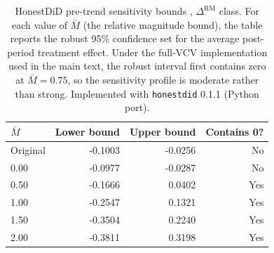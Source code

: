 \begin{table}[ht]
\centering
\caption{HonestDiD pre-trend sensitivity bounds \citep{rambachan2023honest}, $\Delta^{\text{RM}}$ class. For each value of $\bar{M}$ (the relative magnitude bound), the table reports the robust 95\% confidence set for the average post-period treatment effect. Under the full-VCV implementation used in the main text, the robust interval first contains zero at $\bar M=0.75$, so the sensitivity profile is moderate rather than strong. Implemented with \texttt{honestdid} 0.1.1 (Python port).}
\label{tab:honestdid_bounds}
\small \setlength{\tabcolsep}{6pt}
\begin{tabular}{lrrr}
\toprule
$\bar{M}$ & Lower bound & Upper bound & Contains 0? \\
\midrule
Original & -0.1003 & -0.0256 & No \\
0.00 & -0.0977 & -0.0287 & No \\
0.50 & -0.1666 & 0.0402 & Yes \\
1.00 & -0.2547 & 0.1321 & Yes \\
1.50 & -0.3504 & 0.2240 & Yes \\
2.00 & -0.3811 & 0.3198 & Yes \\
\bottomrule
\end{tabular}
\end{table}
